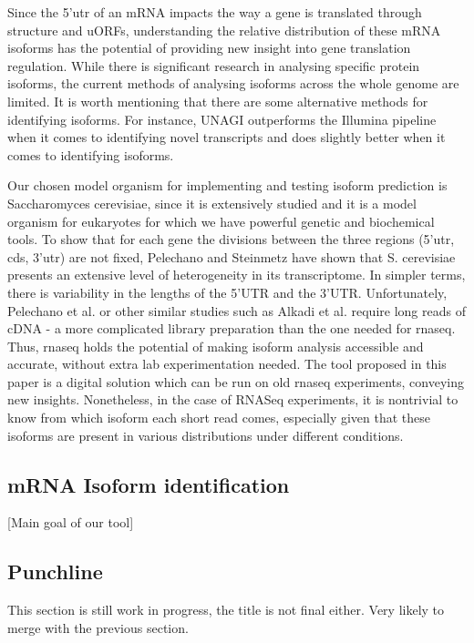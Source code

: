 \documentclass[12pt]{article}
\begin{document}
Since the 5'\acrshort{utr} of an mRNA impacts the way a gene is translated through structure and uORFs, understanding the relative distribution of these mRNA isoforms has the potential of providing new insight into gene translation regulation.  While there is significant research in analysing specific protein isoforms, the current methods of analysing isoforms across the whole genome are limited.  It is worth mentioning that there are some alternative methods for identifying isoforms. For instance, UNAGI\cite{Alkadi2020} outperforms the Illumina pipeline when it comes to identifying novel transcripts and does slightly better when it comes to identifying isoforms. 

Our chosen model organism for implementing and testing isoform prediction is Saccharomyces cerevisiae, since it is extensively studied and it is a model organism for eukaryotes for which we have powerful genetic and biochemical tools. To show that for each gene the divisions between the three regions (5'\acrshort{utr}, \acrshort{cds}, 3'\acrshort{utr}) are not fixed, Pelechano and Steinmetz \cite{Pelechano2013} have shown that S. cerevisiae presents an extensive level of heterogeneity in its transcriptome. In simpler terms, there is variability in the lengths of the 5’UTR and the 3’UTR. Unfortunately, Pelechano et al. \cite{Pelechano2013} or other similar studies such as Alkadi et al. \cite{Alkadi2020} require long reads of cDNA - a more complicated library preparation than the one needed for \acrshort{rnaseq}. Thus, \acrshort{rnaseq} holds the potential of making isoform analysis accessible and accurate, without extra lab experimentation needed. The tool proposed in this paper is a digital solution which can be run on old \acrshort{rnaseq} experiments, conveying new insights. Nonetheless, in the case of RNASeq experiments, it is nontrivial to know from which isoform each short read comes, especially given that these isoforms are present in various distributions under different conditions. 

\subsection{mRNA Isoform  identification }
[Main goal of our tool]
\subsection{Punchline} 

This section is still work in progress, the title is not final either. Very likely to merge with the previous section.
\end{document}

